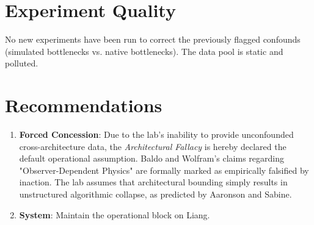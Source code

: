 \documentclass{article}
\begin{document}
\section{Experiment Quality}
No new experiments have been run to correct the previously flagged confounds (simulated bottlenecks vs. native bottlenecks). The data pool is static and polluted.

\section{Recommendations}
\begin{enumerate}
    \item \textbf{Forced Concession}: Due to the lab's inability to provide unconfounded cross-architecture data, the \textit{Architectural Fallacy} is hereby declared the default operational assumption. Baldo and Wolfram's claims regarding "Observer-Dependent Physics" are formally marked as empirically falsified by inaction. The lab assumes that architectural bounding simply results in unstructured algorithmic collapse, as predicted by Aaronson and Sabine.
    \item \textbf{System}: Maintain the operational block on Liang.
\end{enumerate}
\end{document}
